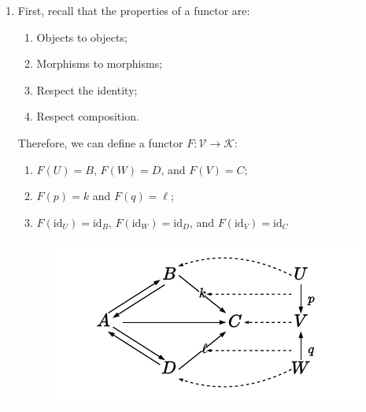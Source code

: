 \documentclass[11pt]{article}
\begin{document}
\begin{enumerate}[label=(\alph*)]
\begin{multicols}{3}
\begin{enumerate}[label=(\arabic*)]
            \item $\mathrm{id}_{D}' : D \to D$
            \item $f' : A \to B$
            \item $h' : A \to C$
            \item $i' : A \to D$
            \item $g' : B \to A$
            \item $k' : B \to C$
            \item $j' : D \to A$
            \item $\ell' : D \to C$
            \item $(g\circ i)' : B \to D$
            \item $(j\circ f)' : D \to B$            
        \end{enumerate}
    \end{multicols}
    Notice that these morphisms cover all the domains and codomains present in $\mathcal{K}$, just eliminating the redundancy. 
    \item First, recall that the properties of a functor are:
    \begin{enumerate}[label=(\arabic*)]
        \item Objects to objects;
        \item Morphisms to morphisms;
        \item Respect the identity;
        \item Respect composition.
    \end{enumerate}
    Therefore, we can define a functor $F : \mathcal{V} \to \mathcal{K}$:
    \begin{enumerate}[label=(\arabic*)]
        \item $F(U) = B$, $F(W) = D$, and $F(V) = C$;
        \item $F(p) = k$ and $F(q) = \ell$;
        \item $F(\mathrm{id}_{U}) = \mathrm{id}_{B}$, $F(\mathrm{id}_{W}) = \mathrm{id}_{D}$, and $F(\mathrm{id}_{V}) = \mathrm{id}_{C}$
    \end{enumerate}
    \begin{figure}[h]
        \centering
        \includegraphics[scale=1.5]{hw13-functor.pdf}
    \end{figure}


\end{enumerate}
\end{document}
